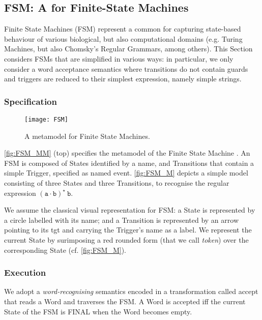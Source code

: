\subsection{\textsf{FSM}: A \DSL for Finite-State Machines}
\label{sec:Examples:FSM}

Finite State Machines (FSM) represent a common \DSL for capturing state-based 
behaviour of various biological, but also computational domains (e.g. Turing 
Machines, but also Chomsky's Regular Grammars, among others). This Section considers
FSMs that are simplified in various ways: in particular, we only consider a
word acceptance semantics where transitions do not contain guards and triggers are
reduced to their simplest expression, namely simple strings.

\subsubsection{Specification}
\label{sec:Examples:FSM:Specification}

\begin{figure}[t]%
   \texttt{[image: FSM]}%
   \caption{A metamodel for Finite State Machines.}%
   \label{fig:FSM_MM}%
\end{figure}


\autoref{fig:FSM_MM} (top) specifies the metamodel of the Finite State Machine \DSL. 
An \textsf{FSM} is composed of \textsf{State}s identified by a \textsf{name}, and
\textsf{Transition}s that contain a simple \textsf{Trigger}, specified as 
\textsf{name}d event. \autoref{fig:FSM_M} depicts a simple model consisting of 
three \textsf{State}s and three \textsf{Transition}s, to recognise the regular 
expression $\mathtt{(a\cdot b)^\star\ b}$. 

We assume the classical visual representation for \textsf{FSM}: a \textsf{State}
is represented by a circle labelled with its \textsf{name}; and a 
\textsf{Transition} is represented by an arrow pointing to its \textsf{tgt} and 
carrying the \textsf{Trigger}'s name as a label. We represent the \textsf{current}
\textsf{State} by surimposing a red rounded form (that we call \emph{token}) over
the corresponding \textsf{State} (cf. \autoref{fig:FSM_M}).


\subsubsection{Execution}
\label{sec:Examples:FSM:Execution}

We adopt a \emph{word-recognising} semantics encoded in a transformation called
\textsf{accept} that reads a \textsf{Word} and traverses the \textsf{FSM}. A 
\textsf{Word} is accepted iff the \textsf{current} \textsf{State} of the \textsf{FSM}
is \textsf{FINAL} when the \textsf{Word} becomes empty.


